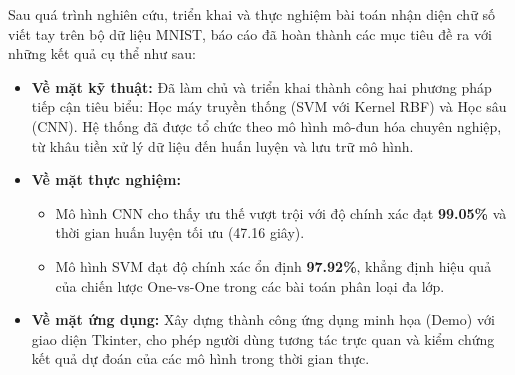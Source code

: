 \documentclass[../DoAn.tex]{subfiles}
\begin{document}
Sau quá trình nghiên cứu, triển khai và thực nghiệm bài toán nhận diện chữ số viết tay trên bộ dữ liệu MNIST, báo cáo đã hoàn thành các mục tiêu đề ra với những kết quả cụ thể như sau:

\begin{itemize}
    \item \textbf{Về mặt kỹ thuật:} Đã làm chủ và triển khai thành công hai phương pháp tiếp cận tiêu biểu: Học máy truyền thống (SVM với Kernel RBF) và Học sâu (CNN). Hệ thống đã được tổ chức theo mô hình mô-đun hóa chuyên nghiệp, từ khâu tiền xử lý dữ liệu đến huấn luyện và lưu trữ mô hình.
    \item \textbf{Về mặt thực nghiệm:} 
    \begin{itemize}
        \item Mô hình CNN cho thấy ưu thế vượt trội với độ chính xác đạt \textbf{99.05\%} và thời gian huấn luyện tối ưu (47.16 giây). 
        \item Mô hình SVM đạt độ chính xác ổn định \textbf{97.92\%}, khẳng định hiệu quả của chiến lược One-vs-One trong các bài toán phân loại đa lớp.
    \end{itemize}
    \item \textbf{Về mặt ứng dụng:} Xây dựng thành công ứng dụng minh họa (Demo) với giao diện Tkinter, cho phép người dùng tương tác trực quan và kiểm chứng kết quả dự đoán của các mô hình trong thời gian thực.
\end{itemize} 
\end{document}
